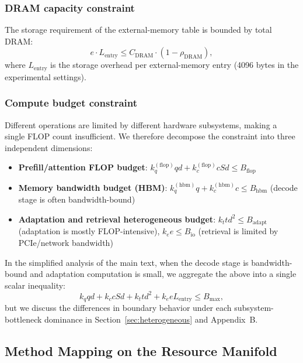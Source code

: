 \documentclass[11pt,a4paper]{article}
\theoremstyle{plain}
\theoremstyle{definition}
\begin{document}
\subsubsection*{DRAM capacity constraint}
The storage requirement of the external-memory table is bounded by total DRAM:
\[
e \cdot L_{\text{entry}} \leq C_{\text{DRAM}} \cdot (1 - \rho_{\text{DRAM}}),
\]
where $L_{\text{entry}}$ is the storage overhead per external-memory entry (4096 bytes in the experimental settings).

\subsubsection*{Compute budget constraint}
Different operations are limited by different hardware subsystems, making a single FLOP count insufficient. We therefore decompose the constraint into three independent dimensions:
\begin{itemize}
    \item \textbf{Prefill/attention FLOP budget}: $k_q^{(\text{flop})} q d + k_c^{(\text{flop})} c S d \leq B_{\text{flop}}$
    \item \textbf{Memory bandwidth budget (HBM)}: $k_q^{(\text{hbm})} q + k_c^{(\text{hbm})} c \leq B_{\text{hbm}}$ (decode stage is often bandwidth-bound)
    \item \textbf{Adaptation and retrieval heterogeneous budget}: $k_t t d^2 \leq B_{\text{adapt}}$ (adaptation is mostly FLOP-intensive), $k_e e \leq B_{\text{io}}$ (retrieval is limited by PCIe/network bandwidth)
\end{itemize}
In the simplified analysis of the main text, when the decode stage is bandwidth-bound and adaptation computation is small, we aggregate the above into a single scalar inequality:
\[
k_q q d + k_c c S d + k_t t d^2 + k_e e L_{\text{entry}} \leq B_{\max},
\]
but we discuss the differences in boundary behavior under each subsystem-bottleneck dominance in Section~\ref{sec:heterogeneous} and Appendix~B.

\subsection{Method Mapping on the Resource Manifold}
\end{document}
